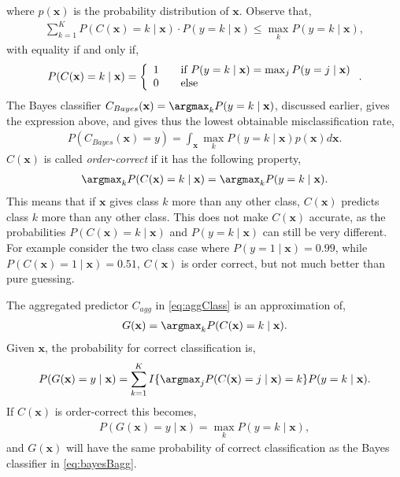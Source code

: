 where $p(\mathbf{x})$ is the probability distribution of $\mathbf{x}$. Observe that, 
\begin{align}
  \sum^{K}_{k=1} P(C(\mathbf{x}) = k \mid \mathbf{x}) \cdot P(y=k \mid \mathbf{x}) \leq \max_k P(y = k \mid \mathbf{x}),
\end{align}
with equality if and only if,
\begin{align}
  P(C(\mathbf{x}) = k \mid \mathbf{x}) = \left\{ 
  \begin{array}{l l}
    1 & \quad \text{if } P(y = k \mid \mathbf{x}) = \max_j P(y = j \mid \mathbf{x})\\
    0 & \quad \text{else}
  \end{array} \right. .
\end{align}
The Bayes classifier $C_{Bayes}(\mathbf{x}) = \argmax_k P(y = k \mid \mathbf{x})$, discussed earlier, gives the expression above, and gives thus the lowest obtainable misclassification rate,
\begin{align}
  \label{eq:bayesBagg} 
  P(C_{Bayes}(\mathbf{x}) = y) = \int_{\mathbf{x}} \max_k P(y=k \mid \mathbf{x})  p(\mathbf{x}) d\mathbf{x}.
\end{align}
$C(\mathbf{x})$ is called \textit{order-correct} if it has the following property,
\begin{align}
  \argmax_k P(C(\mathbf{x}) = k \mid \mathbf{x}) = \argmax_k  P(y = k \mid \mathbf{x}).
\end{align}
This means that if $\mathbf{x}$ gives class $k$ more than any other class, $C(\mathbf{x})$ predicts class $k$ more than any other class. This does not make $C(\mathbf{x})$ accurate, as the probabilities $P(C(\mathbf{x}) = k \mid \mathbf{x}) $ and $P(y = k \mid \mathbf{x})$ can still be very different. For example consider the two class case where $P(y = 1 \mid \mathbf{x})  = 0.99$, while $P(C(\mathbf{x}) = 1\mid \mathbf{x}) = 0.51$, $C(\mathbf{x})$ is order correct, but not much better than pure guessing.

The aggregated predictor $C_{agg}$ in \eqref{eq:aggClass} is an approximation of, 
\begin{align}
  G(\mathbf{x}) = \argmax_k P(C(\mathbf{x})=k \mid \mathbf{x}).
\end{align}
Given $\mathbf{x}$, the probability for correct classification is,
\begin{align}
  P(G(\mathbf{x}) = y \mid \mathbf{x})  
  = \sum^{K}_{k=1} I\{ \argmax_j P(C(\mathbf{x}) = j \mid \mathbf{x}) = k \} P(y=k \mid \mathbf{x}).
\end{align}
If $C(\mathbf{x})$ is order-correct this becomes,
\begin{align}
  P(G(\mathbf{x}) = y \mid \mathbf{x})  = \max_k P(y = k \mid \mathbf{x}),
\end{align}
and $G(\mathbf{x})$ will have the same probability of correct classification as the Bayes classifier in  \eqref{eq:bayesBagg}. 

